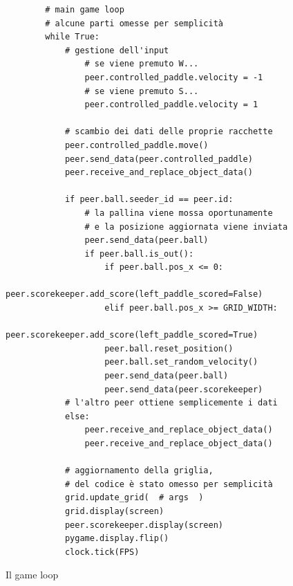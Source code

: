 \begin{figure}
    \begin{verbatim}
        # main game loop
        # alcune parti omesse per semplicità
        while True:
            # gestione dell'input
                # se viene premuto W...
                peer.controlled_paddle.velocity = -1
                # se viene premuto S...
                peer.controlled_paddle.velocity = 1

            # scambio dei dati delle proprie racchette
            peer.controlled_paddle.move()
            peer.send_data(peer.controlled_paddle)
            peer.receive_and_replace_object_data()

            if peer.ball.seeder_id == peer.id:
                # la pallina viene mossa oportunamente
                # e la posizione aggiornata viene inviata
                peer.send_data(peer.ball)
                if peer.ball.is_out():
                    if peer.ball.pos_x <= 0:
                        peer.scorekeeper.add_score(left_paddle_scored=False)
                    elif peer.ball.pos_x >= GRID_WIDTH:
                        peer.scorekeeper.add_score(left_paddle_scored=True)
                    peer.ball.reset_position()
                    peer.ball.set_random_velocity()
                    peer.send_data(peer.ball)
                    peer.send_data(peer.scorekeeper)
            # l'altro peer ottiene semplicemente i dati
            else:
                peer.receive_and_replace_object_data()
                peer.receive_and_replace_object_data()

            # aggiornamento della griglia,
            # del codice è stato omesso per semplicità
            grid.update_grid(  # args  )
            grid.display(screen)
            peer.scorekeeper.display(screen)
            pygame.display.flip()
            clock.tick(FPS)
    \end{verbatim}
    \caption{Il game loop}
    \label{fig:game-loop}
\end{figure}
